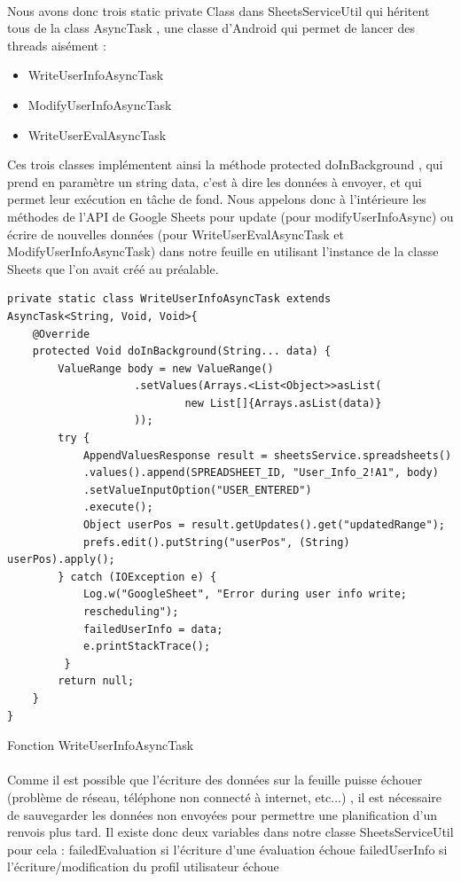 \documentclass[../main.tex]{subfiles}
\begin{document}
\paragraph{}
Nous avons donc trois static private Class dans SheetsServiceUtil qui héritent tous de la class AsyncTask , une classe d’Android qui permet de lancer des threads aisément : 
 \begin{itemize}
\item WriteUserInfoAsyncTask
\item ModifyUserInfoAsyncTask
\item WriteUserEvalAsyncTask
\end{itemize}
Ces trois classes implémentent ainsi la méthode protected doInBackground , qui prend en paramètre un string data, c’est à dire les données à envoyer, et qui permet leur exécution en tâche de fond.
Nous appelons donc à l'intérieure les méthodes de l’API de Google Sheets pour update (pour modifyUserInfoAsync) 
ou écrire de nouvelles données (pour WriteUserEvalAsyncTask et ModifyUserInfoAsyncTask) dans notre feuille en utilisant l’instance de la classe Sheets que l’on avait créé au préalable.
\hfill \break 
\begin{lstlisting}[tabsize=3]
private static class WriteUserInfoAsyncTask extends 
AsyncTask<String, Void, Void>{
	@Override
	protected Void doInBackground(String... data) {
		ValueRange body = new ValueRange()
                    .setValues(Arrays.<List<Object>>asList(
                            new List[]{Arrays.asList(data)}
                    ));
		try {
			AppendValuesResponse result = sheetsService.spreadsheets()
			.values().append(SPREADSHEET_ID, "User_Info_2!A1", body)
			.setValueInputOption("USER_ENTERED")
			.execute();
			Object userPos = result.getUpdates().get("updatedRange");
			prefs.edit().putString("userPos", (String) userPos).apply();
		} catch (IOException e) {
			Log.w("GoogleSheet", "Error during user info write; 
			rescheduling");
			failedUserInfo = data;
			e.printStackTrace();
		 }
		return null;
	}
}
\end{lstlisting}
Fonction WriteUserInfoAsyncTask
\paragraph{}
Comme il est possible que l’écriture des données sur la feuille puisse échouer (problème de réseau, téléphone non connecté à internet, etc...) , il est nécessaire de sauvegarder les données non envoyées pour permettre une planification d’un renvois plus tard. Il existe donc deux variables dans notre classe SheetsServiceUtil pour cela : 
failedEvaluation si l’écriture d’une évaluation échoue
failedUserInfo si l’écriture/modification du profil utilisateur échoue
\end{document}
